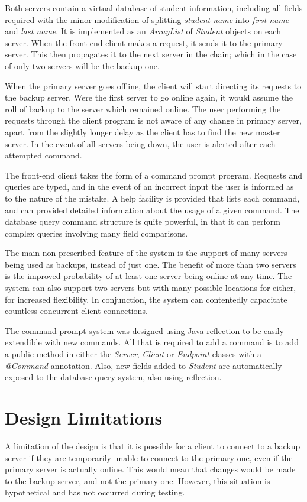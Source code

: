 \documentclass[a4paper,11pt]{article}
\begin{document}
Both servers contain a virtual database of student information, including all fields required with the minor modification of splitting \emph{student name} into \emph{first name} and \emph{last name}. It is implemented as an \emph{ArrayList} of \emph{Student} objects on each server. When the front-end client makes a request, it sends it to the primary server. This then propagates it to the next server in the chain; which in the case of only two servers will be the backup one.

When the primary server goes offline, the client will start directing its requests to the backup server. Were the first server to go online again, it would assume the roll of backup to the server which remained online. The user performing the requests through the client program is not aware of any change in primary server, apart from the slightly longer delay as the client has to find the new master server. In the event of all servers being down, the user is alerted after each attempted command.

The front-end client takes the form of a command prompt program. Requests and queries are typed, and in the event of an incorrect input the user is informed as to the nature of the mistake. A help facility is provided that lists each command, and can provided detailed information about the usage of a given command. The database query command structure is quite powerful, in that it can perform complex queries involving many field comparisons.

The main non-prescribed feature of the system is the support of many servers being used as backups, instead of just one. The benefit of more than two servers is the improved probability of at least one server being online at any time. The system can also support two servers but with many possible locations for either, for increased flexibility. In conjunction, the system can contentedly capacitate countless concurrent client connections.

The command prompt system was designed using Java reflection to be easily extendible with new commands. All that is required to add a command is to add a public method in either the \emph{Server}, \emph{Client} or \emph{Endpoint} classes with a \emph{@Command} annotation. Also, new fields added to \emph{Student} are automatically exposed to the database query system, also using reflection.

\section{Design Limitations}
A limitation of the design is that it is possible for a client to connect to a backup server if they are temporarily unable to connect to the primary one, even if the primary server is actually online. This would mean that changes would be made to the backup server, and not the primary one. However, this situation is hypothetical and has not occurred during testing.
\end{document}
